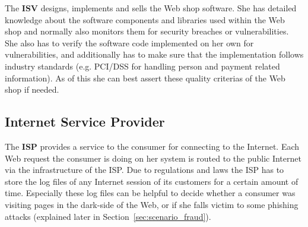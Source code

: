 The \textbf{ISV} designs, implements and sells the Web shop software. She has detailed knowledge about the software components and libraries used within the Web shop and normally also monitors them for security breaches or vulnerabilities. She also has to verify the software code implemented on her own for vulnerabilities, and additionally has to make sure that the implementation follows industry standards (e.g. PCI/DSS for handling person and payment related information). As of this she can best assert these quality criterias of the Web shop if needed.


\subsection{Internet Service Provider}
\label{subsec:stakeholder_isp}

The \textbf{ISP} provides a service to the consumer for connecting to the Internet. Each Web request the consumer is doing on her system is routed to the public Internet via the infrastructure of the \gls{ISP}. Due to regulations and laws the \gls{ISP} has to store the log files of any Internet session of its customers for a certain amount of time. Especially these log files can be helpful to decide whether a consumer was visiting pages in the dark-side of the Web, or if she falls victim to some phishing attacks (explained later in Section~\ref{sec:scenario_fraud}).


